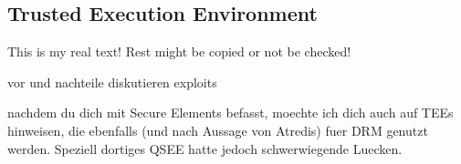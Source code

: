 \subsection{Trusted Execution Environment}\label{subsection:evaluation-external-tee}
This is my real text! Rest might be copied or not be checked!


vor und nachteile diskutieren
exploits

nachdem du dich mit Secure Elements befasst, moechte ich dich auch auf TEEs hinweisen, die ebenfalls (und nach Aussage von Atredis) fuer DRM genutzt werden. Speziell dortiges QSEE hatte jedoch schwerwiegende Luecken.
